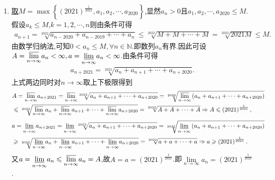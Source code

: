 \documentclass[../../main.tex]{subfiles}
\begin{document}
\begin{solution}
\begin{enumerate}
\item \hyperref[example3.23-2]{取\(M=\max \left\{ \left( 2021 \right) ^{\frac{1}{2021}},a_1,a_2,\cdots ,a_{2020} \right\}\)},显然$a_n>0$且$a_1,a_2,\cdots ,a_{2020}\leqslant  M$.假设$a_k\leqslant  M$,$k=1,2,\cdots,n$则由条件可得
\begin{align*}
a_{n+1}=\sqrt[2022]{a_{n-2020}+a_{n-2019}+\cdots +a_{n}}\le \sqrt[2022]{M+M+\cdots +M}=\sqrt[2022]{2021M}\le M.
\end{align*}
由数学归纳法,可知$0<a_n\leqslant  M,\forall n\in\mathbb{N}$.即数列${a_n}$有界.因此可设$A=\underset{n\rightarrow \infty}{{\varlimsup }}a_n<\infty ,a=\underset{n\rightarrow \infty}{{\varliminf }}a_n<\infty$.由条件可得
\begin{align*}
a_{n+2021}=\sqrt[2022]{a_n+a_{n+1}+\cdots +a_{n+2020}}.
\end{align*}
上式两边同时对$n\to \infty$取上下极限得到
\begin{align*}
&A=\underset{n\rightarrow \infty}{{\varlimsup }}a_{n+2021}=\underset{n\rightarrow \infty}{{\varlimsup }}\sqrt[2022]{a_n+a_{n+1}+\cdots +a_{n+2020}}=\sqrt[2022]{\underset{n\rightarrow \infty}{{\varlimsup }}\left( a_n+a_{n+1}+\cdots +a_{n+2020} \right)}
\\
&\leqslant \sqrt[2022]{\underset{n\rightarrow \infty}{{\varlimsup }}a_n+\underset{n\rightarrow \infty}{{\varlimsup }}a_{n+1}+\cdots +\underset{n\rightarrow \infty}{{\varlimsup }}a_{n+2020}}=\sqrt[2022]{A+A+\cdots +A}\Rightarrow A\leqslant \left( 2021 \right) ^{\frac{1}{2021}},   
\end{align*}
\begin{align*}
&a=\underset{n\rightarrow \infty}{{\varliminf }}a_{n+2021}=\underset{n\rightarrow \infty}{{\varliminf }}\sqrt[2022]{a_n+a_{n+1}+\cdots +a_{n+2020}}=\sqrt[2022]{\underset{n\rightarrow \infty}{{\varliminf }}\left( a_n+a_{n+1}+\cdots +a_{n+2020} \right)}
\\
&\geqslant \sqrt[2022]{\underset{n\rightarrow \infty}{{\varliminf }}a_n+\underset{n\rightarrow \infty}{{\varliminf }}a_{n+1}+\cdots +\underset{n\rightarrow \infty}{{\varliminf }}a_{n+2020}}=\sqrt[2022]{a+a+\cdots +a}\Rightarrow a\geqslant \left( 2021 \right) ^{\frac{1}{2021}}.
\end{align*}
又$a=\underset{n\rightarrow \infty}{{\varliminf }}a_n\leqslant \underset{n\rightarrow \infty}{{\varlimsup }}a_n=A$,故$A=a=\left( 2021 \right) ^{\frac{1}{2021}}$.即$\underset{n\rightarrow \infty}{\lim}a_n=\left( 2021 \right) ^{\frac{1}{2021}}$.
\end{enumerate}

\end{solution}
\end{document}
